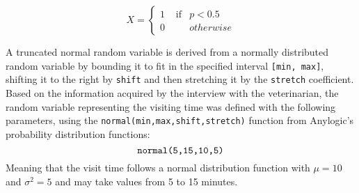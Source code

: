 \documentclass[review]{article}
\begin{document}
$$
	X = \left\{  \begin{array}{rcl} 1& \mbox{ if} &p<0.5\\ 0 & \mbox{} & otherwise
						\end{array}\right.
$$

A truncated normal random variable is derived from a normally distributed random variable by bounding it to fit in the specified interval \verb|[min, max]|, shifting it to the right by \verb|shift| and then stretching it by the \verb|stretch| coefficient. Based on the information acquired by the interview with the veterinarian, the random variable representing the visiting time was defined with the following parameters, using the \verb|normal(min,max,shift,stretch)| function from Anylogic's probability distribution functions:
$$
	\verb|normal(5,15,10,5)|
$$
Meaning that the visit time follows a normal distribution function with $\mu = 10$ and ${\sigma^2} = 5$ and may take values from 5 to 15 minutes.\\\\

\nocite{*}

\end{document}
